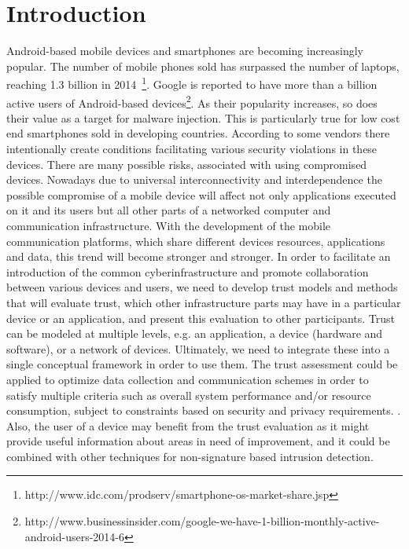 \section{Introduction}

Android-based mobile devices and smartphones are becoming increasingly popular.  The number of mobile phones
sold has surpassed the number of laptops, reaching 1.3 billion in 
2014~\footnote{http://www.idc.com/prodserv/smartphone-os-market-share.jsp}.  Google is 
reported to have more than a billion active users of 
Android-based devices\footnote{http://www.businessinsider.com/google-we-have-1-billion-monthly-active-android-users-2014-6}.  
As their popularity increases, so does their value as
a target for malware injection.  
This is particularly true for low cost end smartphones sold in developing countries. According to \cite{zheng2014droidray}
some vendors there intentionally create conditions facilitating various security violations in these devices.
 There are many possible risks, associated with using compromised devices.  Nowadays due to universal interconnectivity and 
interdependence the 
possible compromise of a mobile device will affect not only applications executed on it and its users but all other parts 
of a networked computer and communication infrastructure.
With the development of the mobile communication platforms, which share different devices resources, applications and data, 
this trend will become stronger and stronger. 
In order to facilitate an introduction of the common cyberinfrastructure and promote collaboration between various devices 
and users, we need to develop trust models and methods that will evaluate trust, which other infrastructure parts may have in a 
particular device or an application, and present this evaluation to other participants. Trust can be modeled at 
multiple levels, e.g. an application, a device (hardware and software), or a network of devices.  Ultimately, we need to 
integrate these into a single conceptual framework in order to use them.
The trust assessment  could 
be applied to optimize data collection and communication schemes in order to satisfy multiple criteria such as overall 
system performance and/or resource consumption, subject to constraints based on security and privacy requirements.
. Also, the user of a device may benefit from the trust evaluation as it might 
provide useful information about areas in need of improvement, and it could be combined with other techniques for
 non-signature based intrusion detection.

